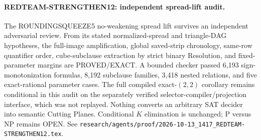 \paragraph{REDTEAM-STRENGTHEN12: independent spread-lift audit.}
The ROUNDINGSQUEEZE5 no-weakening spread lift survives an independent
adversarial review.  From its stated normalized-spread and triangle-DAG
hypotheses, the full-image amplification, global saved-strip chronology,
same-row quantifier order, cube-subclause extraction by strict binary
Resolution, and fixed-parameter margins are PROVED/EXACT.  A bounded checker
passed 6,193 sign-monotonization formulas, 8,192 subclause families, 3,418
nested relations, and five exact-rational parameter cases.  The full
compiled exact-$(2,2)$ corollary remains conditional in this audit on the
separately verified selector-compiler/projection interface, which was not
replayed.  Nothing converts an arbitrary SAT decider into semantic Cutting
Planes.  Conditional $K$ elimination is unchanged; P versus NP remains OPEN.
See \texttt{research/agents/proof/2026-10-13\_1417\_REDTEAM-STRENGTHEN12.tex}.
